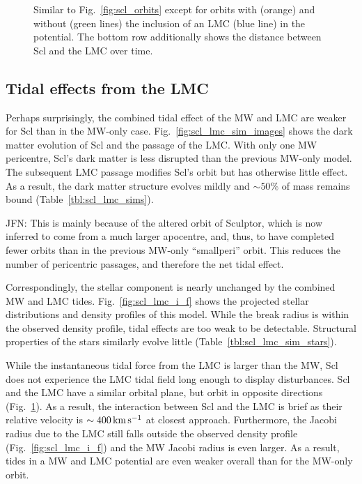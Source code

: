 \begin{figure}
\centering
{}
\caption[Sculptor orbits with LMC]{Similar to Fig.~\ref{fig:scl_orbits}
except for orbits with (orange) and without (green lines) the inclusion
of an LMC (blue line) in the potential. The bottom row additionally
shows the distance between Scl and the LMC over
time.}\label{fig:scl_lmc_orbits_effect}
\end{figure}

\subsection{Tidal effects from the
LMC}\label{tidal-effects-from-the-lmc}

Perhaps surprisingly, the combined tidal effect of the MW and LMC are
weaker for Scl than in the MW-only case.
Fig.~\ref{fig:scl_lmc_sim_images} shows the dark matter evolution of Scl
and the passage of the LMC. With only one MW pericentre, Scl's dark
matter is less disrupted than the previous MW-only model. The subsequent
LMC passage modifies Scl's orbit but has otherwise little effect. As a
result, the dark matter structure evolves mildly and \(\sim 50\%\) of
mass remains bound (Table~\ref{tbl:scl_lmc_sims}).

JFN: This is mainly because of the altered orbit of Sculptor, which is
now inferred to come from a much larger apocentre, and, thus, to have
completed fewer orbits than in the previous MW-only ``smallperi'' orbit.
This reduces the number of pericentric passages, and therefore the net
tidal effect.

Correspondingly, the stellar component is nearly unchanged by the
combined MW and LMC tides. Fig.~\ref{fig:scl_lmc_i_f} shows the
projected stellar distributions and density profiles of this model.
While the break radius is within the observed density profile, tidal
effects are too weak to be detectable. Structural properties of the
stars similarly evolve little (Table~\ref{tbl:scl_lmc_sim_stars}).

While the instantaneous tidal force from the LMC is larger than the MW,
Scl does not experience the LMC tidal field long enough to display
disturbances. Scl and the LMC have a similar orbital plane, but orbit in
opposite directions (Fig.~\ref{fig:scl_lmc_orbits_effect}). As a result,
the interaction between Scl and the LMC is brief as their relative
velocity is \(\sim 400\,{\rm km\,s^{-1}}\) at closest approach. Furthermore, the
Jacobi radius due to the LMC still falls outside the observed density
profile (Fig.~\ref{fig:scl_lmc_i_f}) and the MW Jacobi radius is even
larger. As a result, tides in a MW and LMC potential are even weaker
overall than for the MW-only orbit.

